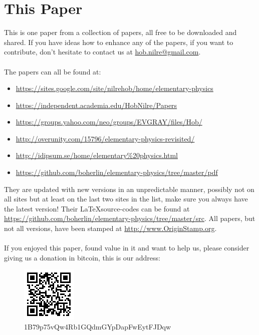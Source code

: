 \section{This Paper}

This is one paper from a collection of papers, all free to be downloaded and shared. If you have ideas how to enhance any of the papers, if you want to contribute, don’t hesitate to contact us at \url{hob.nilre@gmail.com}.\\
\\
The papers can all be found at:
\begin{itemize}
\item \url{https://sites.google.com/site/nilrehob/home/elementary-physics}
\item \url{https://independent.academia.edu/HobNilre/Papers}
\item \url{https://groups.yahoo.com/neo/groups/EVGRAY/files/Hob/}
\item \url{http://overunity.com/15796/elementary-physics-revisited/}
\item \url{http://idipsum.se/home/elementary%20physics.html}
\item \url{https://github.com/boherlin/elementary-physics/tree/master/pdf}
\end{itemize}

They are updated with new versions in an unpredictable manner, possibly not on all sites but at least on the last two sites in the list, make sure you always have the latest version!
Their \LaTeX source-codes can be found at \url{https://github.com/boherlin/elementary-physics/tree/master/src}.
All papers, but not all versions, have been stamped at \url{http://www.OriginStamp.org}.\\
\\
If you enjoyed this paper, found value in it and want to help us, please consider giving us a donation in bitcoin, this is our address:

\begin{figure}[ht] \centering
	\includegraphics[]{1B79p75vQw4Rb1GQdmGYpDapFwEytFJDqw} \caption{1B79p75vQw4Rb1GQdmGYpDapFwEytFJDqw}
\end{figure}
